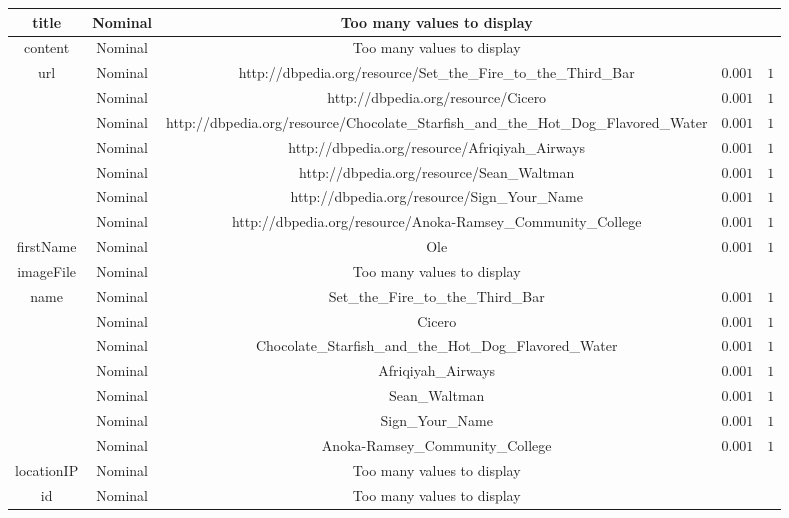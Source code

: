 \begin{tabular}{|c|c|c|c|c|}
title & Nominal & Too many values to display & \\ \hline
content & Nominal & Too many values to display & \\ \hline
\multirow{7}{*}{url} & Nominal & http://dbpedia.org/resource/Set_the_Fire_to_the_Third_Bar & $0.001$ & $1$ \\ \cline{2-4} 
 & Nominal & http://dbpedia.org/resource/Cicero & $0.001$ & $1$ \\ \cline{2-4} 
 & Nominal & http://dbpedia.org/resource/Chocolate_Starfish_and_the_Hot_Dog_Flavored_Water & $0.001$ & $1$ \\ \cline{2-4} 
 & Nominal & http://dbpedia.org/resource/Afriqiyah_Airways & $0.001$ & $1$ \\ \cline{2-4} 
 & Nominal & http://dbpedia.org/resource/Sean_Waltman & $0.001$ & $1$ \\ \cline{2-4} 
 & Nominal & http://dbpedia.org/resource/Sign_Your_Name & $0.001$ & $1$ \\ \cline{2-4} 
 & Nominal & http://dbpedia.org/resource/Anoka-Ramsey_Community_College & $0.001$ & $1$ \\ \hline 
\multirow{1}{*}{firstName} & Nominal & Ole & $0.001$ & $1$ \\ \hline 
imageFile & Nominal & Too many values to display & \\ \hline
\multirow{7}{*}{name} & Nominal & Set_the_Fire_to_the_Third_Bar & $0.001$ & $1$ \\ \cline{2-4} 
 & Nominal & Cicero & $0.001$ & $1$ \\ \cline{2-4} 
 & Nominal & Chocolate_Starfish_and_the_Hot_Dog_Flavored_Water & $0.001$ & $1$ \\ \cline{2-4} 
 & Nominal & Afriqiyah_Airways & $0.001$ & $1$ \\ \cline{2-4} 
 & Nominal & Sean_Waltman & $0.001$ & $1$ \\ \cline{2-4} 
 & Nominal & Sign_Your_Name & $0.001$ & $1$ \\ \cline{2-4} 
 & Nominal & Anoka-Ramsey_Community_College & $0.001$ & $1$ \\ \hline 
locationIP & Nominal & Too many values to display & \\ \hline
id & Nominal & Too many values to display & \\ \hline
\end{tabular}


